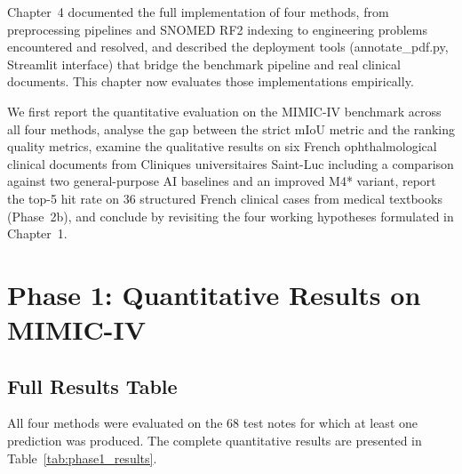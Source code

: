 
Chapter~4 documented the full implementation of four methods, from preprocessing pipelines and SNOMED RF2 indexing to engineering problems encountered and resolved, and described the deployment tools (annotate\_pdf.py, Streamlit interface) that bridge the benchmark pipeline and real clinical documents. This chapter now evaluates those implementations empirically.

We first report the quantitative evaluation on the MIMIC-IV benchmark across all four methods, analyse the gap between the strict mIoU metric and the ranking quality metrics, examine the qualitative results on six French ophthalmological clinical documents from Cliniques universitaires Saint-Luc including a comparison against two general-purpose AI baselines and an improved M4* variant, report the top-5 hit rate on 36 structured French clinical cases from medical textbooks (Phase~2b), and conclude by revisiting the four working hypotheses formulated in Chapter~1.

\section{Phase 1: Quantitative Results on MIMIC-IV}

\subsection{Full Results Table}

All four methods were evaluated on the 68 test notes for which at least one prediction was produced. The complete quantitative results are presented in Table~\ref{tab:phase1_results}.

